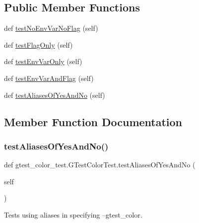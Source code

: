 \subsection*{Public Member Functions}
\begin{DoxyCompactItemize}
\item 
def \hyperlink{classgtest__color__test_1_1_g_test_color_test_a22bf83ab416dc3ccd3c1b771ff74022c}{test\+No\+Env\+Var\+No\+Flag} (self)
\item 
def \hyperlink{classgtest__color__test_1_1_g_test_color_test_abc4c056b8e703e83516f9e5aea8dd25d}{test\+Flag\+Only} (self)
\item 
def \hyperlink{classgtest__color__test_1_1_g_test_color_test_aedb7bbaa0d6acff3628d91a471f4ceb5}{test\+Env\+Var\+Only} (self)
\item 
def \hyperlink{classgtest__color__test_1_1_g_test_color_test_ae88e8ec526135ed1448e83fc4ec7cd15}{test\+Env\+Var\+And\+Flag} (self)
\item 
def \hyperlink{classgtest__color__test_1_1_g_test_color_test_aaf2110e359494dc711e87d29d351dc47}{test\+Aliases\+Of\+Yes\+And\+No} (self)
\end{DoxyCompactItemize}


\subsection{Member Function Documentation}
\mbox{\label{classgtest__color__test_1_1_g_test_color_test_aaf2110e359494dc711e87d29d351dc47}} 
\subsubsection{\texorpdfstring{test\+Aliases\+Of\+Yes\+And\+No()}{testAliasesOfYesAndNo()}}
{\footnotesize\ttfamily def gtest\+\_\+color\+\_\+test.\+G\+Test\+Color\+Test.\+test\+Aliases\+Of\+Yes\+And\+No (\begin{DoxyParamCaption}\item[{}]{self }\end{DoxyParamCaption})}

\begin{DoxyVerb}Tests using aliases in specifying --gtest_color.\end{DoxyVerb}
 \mbox{\label{classgtest__color__test_1_1_g_test_color_test_ae88e8ec526135ed1448e83fc4ec7cd15}} 
